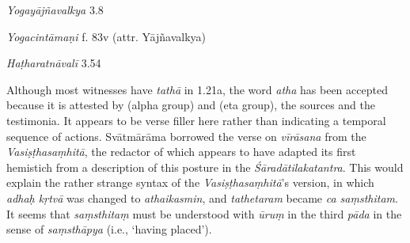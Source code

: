\begin{ekdosis}
\begin{sources}[hp01_021]
\emph{Yogayājñavalkya} 3.8

\begin{versinnote}
\end{versinnote}

\end{sources}

\begin{testimonia}[hp01_021]
\emph{Yogacintāmaṇi} f. 83v (attr. Yājñavalkya)

\begin{versinnote}
\end{versinnote}

\emph{Haṭharatnāvalī} 3.54

\begin{versinnote}
\tl{\var{sthiram ] sthitam T}\\!}
\end{versinnote}

\end{testimonia}

\begin{philcomm}[hp01_021]   
Although most witnesses have \emph{tathā} in 1.21a, the word \emph{atha} has been accepted because it is attested by  (alpha group) and  (eta group), the sources and the testimonia. It appears to be verse filler here rather than indicating a temporal sequence of actions. Svātmārāma borrowed the verse on \emph{vīrāsana} from the \emph{Vasiṣṭhasaṃhitā}, the redactor of which appears to have adapted its first hemistich from a description of this posture in the \emph{Śāradātilakatantra}. This would explain the rather strange syntax of the \emph{Vasiṣṭhasaṃhitā}’s version, in which \emph{adhaḥ kṛtvā} was changed to \emph{athaikasmin}, and \emph{tathetaram} became \emph{ca saṃsthitam}. It seems that \emph{saṃsthitaṃ} must be understood with \emph{ūruṃ} in the third \emph{pāda} in the sense of \emph{saṃsthāpya} (i.e., ‘having placed’).


\end{philcomm}
\end{ekdosis}
